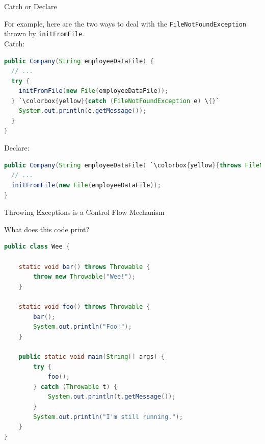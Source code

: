 \documentclass{beamer}
\begin{document}
\begin{frame}[fragile]{Catch or Declare}


For example, here are the two ways to deal with the {\tt FileNotFoundException} thrown by {\tt initFromFile}.\\
\vspace{.1in}
Catch:
\vspace{-.05in}
\begin{lstlisting}[language=Java,escapechar=`]
public Company(String employeeDataFile) {
  // ...
  try {
    initFromFile(new File(employeeDataFile));
  } `\colorbox{yellow}{catch (FileNotFoundException e) \{}`
    System.out.println(e.getMessage());
  }
}
\end{lstlisting}
Declare:
\vspace{-.05in}
\begin{lstlisting}[language=Java,escapechar=`]
public Company(String employeeDataFile) `\colorbox{yellow}{throws FileNotFoundException \{}`
  // ...
  initFromFile(new File(employeeDataFile));
}
\end{lstlisting}



\end{frame}

\begin{frame}[fragile]{Throwing Exceptions is a Control Flow Mechanism}


What does this code print?
\begin{lstlisting}[language=Java]
public class Wee {

    static void bar() throws Throwable {
        throw new Throwable("Wee!");
    }

    static void foo() throws Throwable {
        bar();
        System.out.println("Foo!");
    }

    public static void main(String[] args) {
        try {        
            foo();
        } catch (Throwable t) {
            System.out.println(t.getMessage());
        }
        System.out.println("I'm still running.");
    }
}
\end{lstlisting}

\end{frame}
\end{document}
